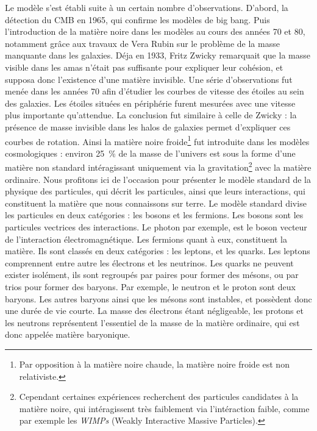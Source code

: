\documentclass[11pt, twoside, a4paper, openright]{report}
\begin{document}
Le modèle s'est établi suite à un certain nombre d'observations. D'abord, la détection du CMB en 1965, qui confirme les modèles de big bang.
Puis l'introduction de la matière noire dans les modèles au cours des années 70 et 80, notamment grâce aux travaux de Vera Rubin sur le problème de la masse manquante dans les galaxies. Déja en 1933, Fritz Zwicky remarquait que la masse visible dans les amas n'était pas suffisante pour expliquer leur cohésion, et supposa donc l'existence d'une matière invisible. Une série d'observations fut menée dans les années 70 afin d'étudier les courbes de vitesse des étoiles au sein des galaxies. Les étoiles situées en périphérie furent mesurées avec une vitesse plus importante qu'attendue. La conclusion fut similaire à celle de Zwicky : la présence de masse invisible dans les halos de galaxies permet d'expliquer ces courbes de rotation. Ainsi la matière noire froide\footnote{Par opposition à la matière noire chaude, la matière noire froide est non relativiste.} fut introduite dans les modèles cosmologiques :
environ \SI{25}{\percent} de la masse de l'univers est sous la forme d'une matière non standard intéragissant uniquement via la gravitation\footnote{Cependant certaines expériences recherchent des particules candidates à la matière noire, qui intéragissent très faiblement via l'intéraction faible, comme par exemple les \emph{WIMPs} (Weakly Interactive Massive Particles).} avec la matière ordinaire. Nous profitons ici de l'occasion pour présenter le modèle standard de la physique des particules, qui décrit les particules, ainsi que leurs interactions, qui constituent la matière que nous connaissons sur terre. Le modèle standard divise les particules en deux catégories : les bosons et les fermions. Les bosons sont les particules vectrices des interactions. Le photon par exemple, est le boson vecteur de l'interaction électromagnétique. Les fermions quant à eux, constituent la matière. Ils sont classés en deux catégories : les leptons, et les quarks. Les leptons comprennent entre autre les électrons et les neutrinos. Les quarks ne peuvent exister isolément, ils sont regroupés par paires pour former des mésons, ou par trios pour former des baryons. Par exemple, le neutron et le proton sont deux baryons. Les autres baryons ainsi que les mésons sont instables, et possèdent donc une durée de vie courte.
La masse des électrons étant négligeable, les protons et les neutrons représentent l’essentiel de la masse de la matière ordinaire, qui est donc appelée matière baryonique.
\end{document}
